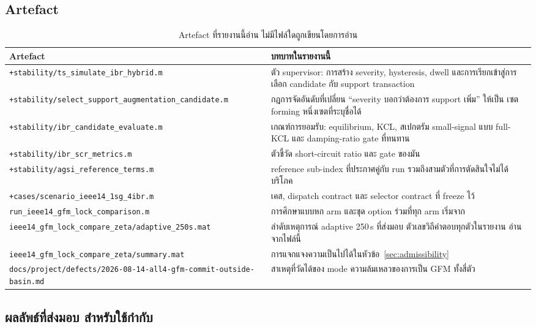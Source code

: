 \documentclass[12pt,a4paper]{article}
\theoremstyle{remark}
\newcommand{\code}[1]{\texttt{\small #1}}
\begin{document}
\subsection{Artefact}

\begin{table}[H]
\centering
\small
\begin{tabularx}{\textwidth}{@{}lX@{}}
\toprule
\textbf{Artefact} & \textbf{บทบาทในรายงานนี้}\\
\midrule
\code{+stability/ts\_simulate\_ibr\_hybrid.m} &
  ตัว supervisor: การสร้าง severity, hysteresis, dwell และการเรียกเข้าสู่การเลือก
  candidate กับ support transaction\\
\code{+stability/select\_support\_augmentation\_candidate.m} &
  กฎการจัดอันดับที่เปลี่ยน ``severity บอกว่าต้องการ support เพิ่ม'' ให้เป็น
  เซต forming หนึ่งเซตที่ระบุชื่อได้\\
\code{+stability/ibr\_candidate\_evaluate.m} &
  เกณฑ์การยอมรับ: equilibrium, KCL, สเปกตรัม small-signal แบบ full-KCL
  และ damping-ratio gate ที่ทนทาน\\
\code{+stability/ibr\_scr\_metrics.m} &
  ตัวชี้วัด short-circuit ratio และ gate ของมัน\\
\code{+stability/agsi\_reference\_terms.m} &
  reference sub-index ที่ประกาศคู่กับ run รวมถึงสามตัวที่การตัดสินใจไม่ได้บริโภค\\
\code{+cases/scenario\_ieee14\_1sg\_4ibr.m} &
  เคส, dispatch contract และ selector contract ที่ freeze ไว้\\
\code{run\_ieee14\_gfm\_lock\_comparison.m} &
  การศึกษาแบบหก arm และชุด option ร่วมที่ทุก arm เริ่มจาก\\
\code{ieee14\_gfm\_lock\_compare\_zeta/adaptive\_250s.mat} &
  ลำดับเหตุการณ์ adaptive 250\,s ที่ส่งมอบ ตัวเลขวิถีคำตอบทุกตัวในรายงาน
  อ่านจากไฟล์นี้\\
\code{ieee14\_gfm\_lock\_compare\_zeta/summary.mat} &
  การแจกแจงความเป็นไปได้ในหัวข้อ~\ref{sec:admissibility}\\
\code{docs/project/defects/2026-08-14-all4-gfm-commit-outside-basin.md} &
  สาเหตุที่วัดได้ของ mode ความล้มเหลวของการเป็น GFM ทั้งสี่ตัว\\
\bottomrule
\end{tabularx}
\caption{Artefact ที่รายงานนี้อ่าน ไม่มีไฟล์ใดถูกเขียนโดยการอ่าน}
\end{table}

\subsection{ผลลัพธ์ที่ส่งมอบ สำหรับใช้กำกับ}
\end{document}
